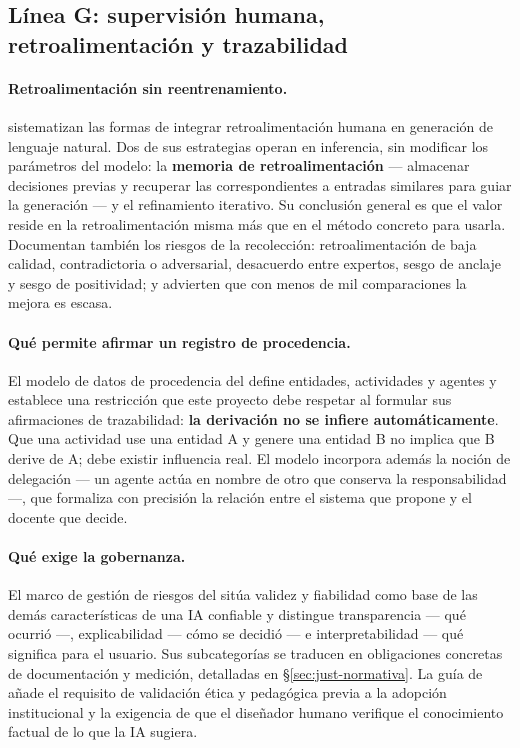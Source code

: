 \subsection{Línea G: supervisión humana, retroalimentación y trazabilidad}
\label{sec:arte-g}

\paragraph{Retroalimentación sin reentrenamiento.}
\textcite{fernandes2023bridging} sistematizan las formas de integrar retroalimentación
humana en generación de lenguaje natural. Dos de sus estrategias operan en inferencia,
sin modificar los parámetros del modelo: la \textbf{memoria de retroalimentación} ---
almacenar decisiones previas y recuperar las correspondientes a entradas similares
para guiar la generación --- y el refinamiento iterativo. Su conclusión general es que
el valor reside en la retroalimentación misma más que en el método concreto para
usarla. Documentan también los riesgos de la recolección: retroalimentación de baja
calidad, contradictoria o adversarial, desacuerdo entre expertos, sesgo de anclaje y
sesgo de positividad; y advierten que con menos de mil comparaciones la mejora es
escasa.

\paragraph{Qué permite afirmar un registro de procedencia.}
El modelo de datos de procedencia del \textcite{moreau2013provdm} define entidades,
actividades y agentes y establece una restricción que este proyecto debe respetar al
formular sus afirmaciones de trazabilidad: \textbf{la derivación no se infiere
automáticamente}. Que una actividad use una entidad A y genere una entidad B no
implica que B derive de A; debe existir influencia real. El modelo incorpora además la
noción de delegación --- un agente actúa en nombre de otro que conserva la
responsabilidad ---, que formaliza con precisión la relación entre el sistema que
propone y el docente que decide.

\paragraph{Qué exige la gobernanza.}
El marco de gestión de riesgos del \textcite{nist2023airmf} sitúa validez y
fiabilidad como base de las demás características de una IA confiable y distingue
transparencia --- qué ocurrió ---, explicabilidad --- cómo se decidió --- e
interpretabilidad --- qué significa para el usuario. Sus subcategorías se traducen en
obligaciones concretas de documentación y medición, detalladas en
§\ref{sec:just-normativa}. La guía de \textcite{miao2023guidance} añade el requisito
de validación ética y pedagógica previa a la adopción institucional y la exigencia de
que el diseñador humano verifique el conocimiento factual de lo que la IA sugiera.


